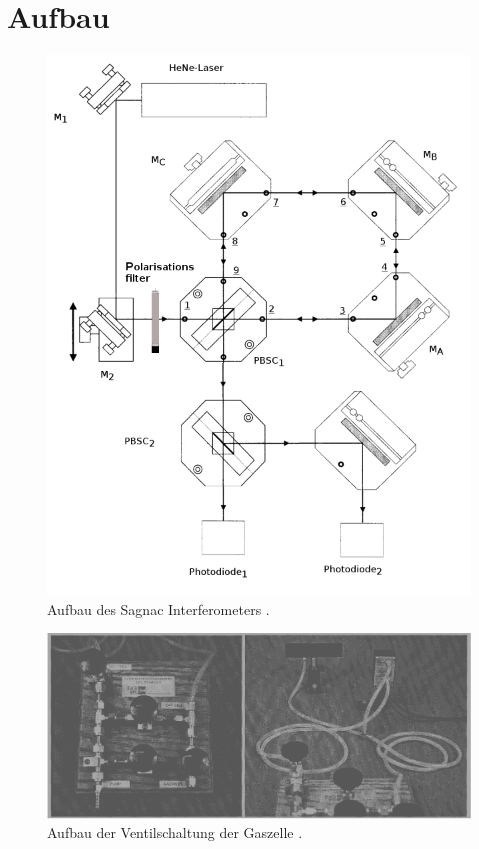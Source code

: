 \section{Aufbau}
\begin{figure}
	\centering
	\includegraphics[width=\linewidth-100pt,height=\textheight-100pt,keepaspectratio]{content/Bilder/aufbau1.png}
	\caption{Aufbau des Sagnac Interferometers \cite{V64}.}
	\label{fig:Aufbau}
\end{figure}

\begin{figure}
	\centering
	\includegraphics[width=\linewidth-100pt,height=\textheight-100pt,keepaspectratio]{content/Bilder/Gaszellelesskontrast.png}
	\caption{Aufbau der Ventilschaltung der Gaszelle \cite{V64}.}
	\label{fig:Gas}
\end{figure}

